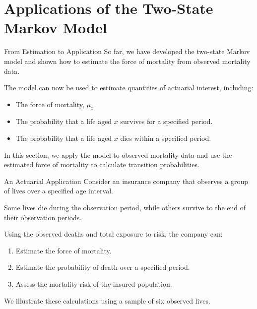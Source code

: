 \documentclass[
  ignorenonframetext,
  aspectratio=169,
]{beamer}
\providecommand{\tightlist}{%
  \setlength{\itemsep}{0pt}\setlength{\parskip}{0pt}}
\begin{document}
\section{Applications of the Two-State Markov
Model}\label{applications-of-the-two-state-markov-model}

\begin{frame}{From Estimation to Application}
\protect{}\label{from-estimation-to-application}
So far, we have developed the two-state Markov model and shown how to
estimate the force of mortality from observed mortality data.

The model can now be used to estimate quantities of actuarial interest,
including:

\begin{itemize}
\tightlist
\item
  The force of mortality, \(\mu_x\).
\item
  The probability that a life aged \(x\) survives for a specified
  period.
\item
  The probability that a life aged \(x\) dies within a specified period.
\end{itemize}

In this section, we apply the model to observed mortality data and use
the estimated force of mortality to calculate transition probabilities.
\end{frame}

\begin{frame}{An Actuarial Application}
\protect{}\label{an-actuarial-application}
Consider an insurance company that observes a group of lives over a
specified age interval.

Some lives die during the observation period, while others survive to
the end of their observation periods.

Using the observed deaths and total exposure to risk, the company can:

\begin{enumerate}
\tightlist
\item
  Estimate the force of mortality.
\item
  Estimate the probability of death over a specified period.
\item
  Assess the mortality risk of the insured population.
\end{enumerate}

We illustrate these calculations using a sample of six observed lives.
\end{frame}
\end{document}

